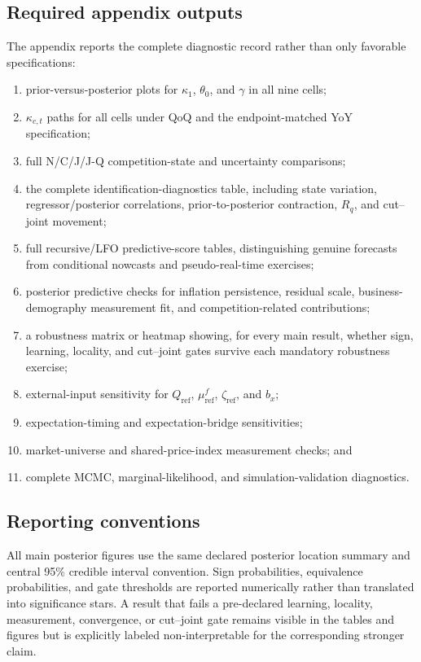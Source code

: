 \documentclass[11pt]{article}
\begin{document}
\subsection{Required appendix outputs}
The appendix reports the complete diagnostic record rather than only favorable specifications:
\begin{enumerate}
\item prior-versus-posterior plots for $\kappa_1$, $\theta_0$, and $\gamma$ in all nine cells;
\item $\kappa_{c,t}$ paths for all cells under QoQ and the endpoint-matched YoY specification;
\item full N/C/J/J-Q competition-state and uncertainty comparisons;
\item the complete identification-diagnostics table, including state variation, regressor/posterior correlations, prior-to-posterior contraction, $R_q$, and cut--joint movement;
\item full recursive/LFO predictive-score tables, distinguishing genuine forecasts from conditional nowcasts and pseudo-real-time exercises;
\item posterior predictive checks for inflation persistence, residual scale, business-demography measurement fit, and competition-related contributions;
\item a robustness matrix or heatmap showing, for every main result, whether sign, learning, locality, and cut--joint gates survive each mandatory robustness exercise;
\item external-input sensitivity for $Q_{\mathrm{ref}}$, $\mu_{\mathrm{ref}}^f$, $\zeta_{\mathrm{ref}}$, and $b_x$;
\item expectation-timing and expectation-bridge sensitivities;
\item market-universe and shared-price-index measurement checks; and
\item complete MCMC, marginal-likelihood, and simulation-validation diagnostics.
\end{enumerate}

\subsection{Reporting conventions}
All main posterior figures use the same declared posterior location summary and central 95\% credible interval convention. Sign probabilities, equivalence probabilities, and gate thresholds are reported numerically rather than translated into significance stars. A result that fails a pre-declared learning, locality, measurement, convergence, or cut--joint gate remains visible in the tables and figures but is explicitly labeled non-interpretable for the corresponding stronger claim.
\end{document}
